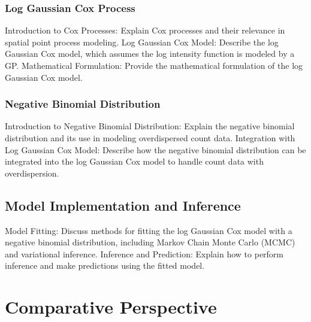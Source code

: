 \subsubsection{Log Gaussian Cox Process}
Introduction to Cox Processes: Explain Cox processes and their relevance in spatial point process modeling.
Log Gaussian Cox Model: Describe the log Gaussian Cox model, which assumes the log intensity function is modeled by a GP.
Mathematical Formulation: Provide the mathematical formulation of the log Gaussian Cox model.
\subsubsection{Negative Binomial Distribution}
Introduction to Negative Binomial Distribution: Explain the negative binomial distribution and its use in modeling overdispersed count data.
Integration with Log Gaussian Cox Model: Describe how the negative binomial distribution can be integrated into the log Gaussian Cox model to handle count data with overdispersion.
\subsection{Model Implementation and Inference}
Model Fitting: Discuss methods for fitting the log Gaussian Cox model with a negative binomial distribution, including Markov Chain Monte Carlo (MCMC) and variational inference.
Inference and Prediction: Explain how to perform inference and make predictions using the fitted model.


\section{Comparative Perspective}

\clearpage

